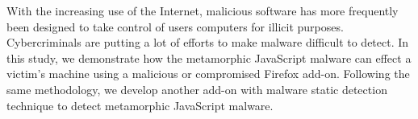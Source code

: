 With the increasing use of the Internet, malicious software has more frequently been designed to take control of users computers for illicit purposes. Cybercriminals are putting a lot of efforts to make malware difficult to detect. In this study, we demonstrate how the metamorphic JavaScript malware can effect a victim's machine using a malicious or compromised Firefox add-on. Following the same methodology, we develop another add-on with malware static detection technique to detect metamorphic JavaScript malware.